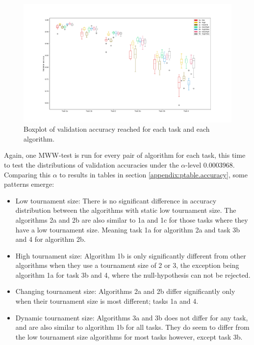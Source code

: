 \begin{figure}
    \includegraphics[width=1.2\textwidth, center]{Chapters/4.Experiments/exp2/figures/large/validation_boxplot.pdf}
    \caption{Boxplot of validation accuracy reached for each task and each algorithm.}
    \label{fig:search.validation}
\end{figure}

Again, one MWW-test is run for every pair of algorithm for each task, this time to test the distributions of validation accuracies under the \(\alpha\)-level 0.0003968. Comparing this \(\alpha\) to results in tables in section \ref{appendix:ptable.accuracy}, some patterns emerge: 
\begin{itemize}
    \item Low tournament size: There is no significant difference in accuracy distribution between the algorithms with static low tournament size. The algorithms 2a and 2b are also similar to 1a and 1c for those tasks where they have a low tournament size. Meaning task 1a for algorithm 2a and task 3b and 4 for algorithm 2b. 
    \item High tournament size: Algorithm 1b is only significantly different from other algorithms when they use a tournament size of 2 or 3, the exception being algorithm 1a for task 3b and 4, where the null-hypothesis can not be rejected. 
    \item Changing tournament size: Algorithms 2a and 2b differ significantly only when their tournament size is most different; tasks 1a and 4. 
    \item Dynamic tournament size: Algorithms 3a and 3b does not differ for any task, and are also similar to algorithm 1b for all tasks. They do seem to differ from the low tournament size algorithms for most tasks however, except task 3b. 
\end{itemize}

